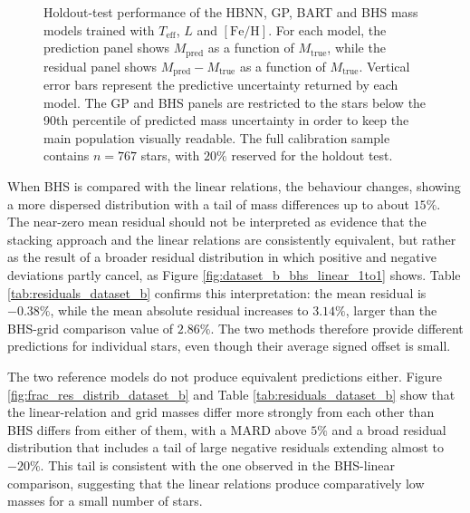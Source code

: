 \begin{figure}[H]
\caption{Holdout-test performance of the HBNN, GP, BART and BHS mass models trained with $T_{\mathrm{eff}}$, $L$ and $[\mathrm{Fe}/\mathrm{H}]$. For each model, the prediction panel shows $M_{\mathrm{pred}}$ as a function of $M_{\mathrm{true}}$, while the residual panel shows $M_{\mathrm{pred}}-M_{\mathrm{true}}$ as a function of $M_{\mathrm{true}}$. Vertical error bars represent the predictive uncertainty returned by each model. The GP and BHS panels are restricted to the stars below the 90th percentile of predicted mass uncertainty in order to keep the main population visually readable. The full calibration sample contains $n=767$ stars, with $20\%$ reserved for the holdout test.}
\label{fig:mass_holdout_all_models_B}

\end{figure}

When BHS is compared with the \citet{moya2018} linear relations, the behaviour changes, showing a more dispersed distribution with a tail of mass differences up to about $15\%$. The near-zero mean residual should not be interpreted as evidence that the stacking approach and the linear relations are consistently equivalent, but rather as the result of a broader residual distribution in which positive and negative deviations partly cancel, as Figure \ref{fig:dataset_b_bhs_linear_1to1} shows. Table \ref{tab:residuals_dataset_b} confirms this interpretation: the mean residual is $-0.38\%$, while the mean absolute residual increases to $3.14\%$, larger than the BHS-grid comparison value of $2.86\%$. The two methods therefore provide different predictions for individual stars, even though their average signed offset is small.

The two reference models do not produce equivalent predictions either. Figure \ref{fig:frac_res_distrib_dataset_b} and Table \ref{tab:residuals_dataset_b} show that the linear-relation and grid masses differ more strongly from each other than BHS differs from either of them, with a MARD above $5\%$ and a broad residual distribution that includes a tail of large negative residuals extending almost to $-20\%$. This tail is consistent with the one observed in the BHS-linear comparison, suggesting that the linear relations produce comparatively low masses for a small number of stars.

